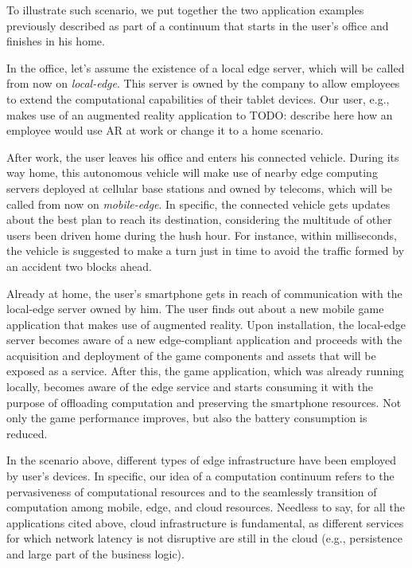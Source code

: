 To illustrate such scenario, we put together the two application examples previously described as part of a continuum that starts in the user's office and finishes in his home. 

In the office, let's assume the existence of a local edge server, which will be called from now on \textit{local-edge}. This server is owned by the company to allow employees to extend the computational capabilities of their tablet devices. Our user, e.g., makes use of an augmented reality application to TODO: describe here how an employee would use AR at work or change it to a home scenario.

After work, the user leaves his office and enters his connected vehicle. During its way home, this autonomous vehicle will make use of nearby edge computing servers deployed at cellular base stations and owned by telecoms, which will be called from now on \textit{mobile-edge}. In specific, the connected vehicle gets updates about the best plan to reach its destination, considering the multitude of other users been driven home during the hush hour. For instance, within milliseconds, the vehicle is suggested to make a turn just in time to avoid the traffic formed by an accident two blocks ahead. 

Already at home, the user's smartphone gets in reach of communication with the local-edge server owned by him. The user finds out about a new mobile game application that makes use of augmented reality. Upon installation, the local-edge server becomes aware of a new edge-compliant application and proceeds with the acquisition and deployment of the game components and assets that will be exposed as a service. After this, the game application, which was already running locally, becomes aware of the edge service and starts consuming it with the purpose of offloading computation and preserving the smartphone resources. Not only the game performance improves, but also the battery consumption is reduced.  

In the scenario above, different types of edge infrastructure have been employed by user's devices. In specific, our idea of a computation continuum refers to the pervasiveness of computational resources and to the seamlessly transition of computation among mobile, edge, and cloud resources. Needless to say, for all the applications cited above, cloud infrastructure is  fundamental, as different services for which network latency is not disruptive are still in the cloud (e.g., persistence and large part of the business logic).


